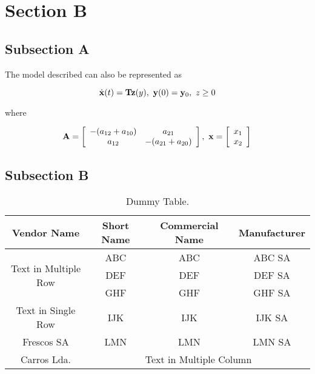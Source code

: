 \section{Section B}
\label{sec:sectionb}

\subsection{Subsection A}
\label{subsec:subasectionB}

The model described can also be represented as

\begin{equation}
\dot{\mathbf{x}}(t) = \mathbf{T}\mathbf{z}(y),\  \mathbf{y}(0) = \mathbf{y}_0,\  z\geq 0 \\
\label{eq:dummyeq1}
\end{equation}

\noindent where

\begin{equation}
\mathbf{A} = \left[ \begin{array}{cc} -(a_{12} + a_{10}) & a_{21} \\ a_{12} & -(a_{21} + a_{20}) \end{array} \right],\ \mathbf{x} = \left[ \begin{array}{c} x_1 \\ x_2 \end{array} \right] \\
\label{eq:dummyeq2}
\end{equation}


\subsection{Subsection B}
\label{subsec:subbsectionB}

\begin{table}[H]
	\centering
	\caption{Dummy Table.}
	\begin{tabular}{|c|c|c|c|} \hline
		\textbf{Vendor Name} 				& \textbf{Short Name}	& \textbf{Commercial Name}	& \textbf{Manufacturer}	\\ \hline \hline
		\multirow{3}{*}{Text in Multiple Row}		&	ABC				&  ABC\textreg				& ABC SA			         \\ \cline{2-4}
		 								&        DEF				&  DEF\textreg				& DEF SA				\\ \cline{2-4}
										&        GHF			&  GHF\textreg				& GHF SA				\\ \hline
		Text in Single Row					&        IJK				& IJK\textreg				& IJK SA				\\ \hline
		Frescos SA						&        LMN			& LMN\textreg				& LMN SA				\\ \hline
		Carros Lda.						&    \multicolumn{3}{|c|}{Text in Multiple Column}							\\ \hline
	\end{tabular}
	\label{tab:dummytable}
\end{table}